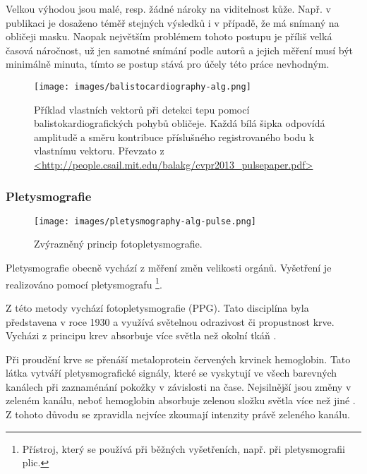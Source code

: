 \documentclass[
  digital, %
  table,   %
%
  lof,     %
  lot,     %
]{fithesis3}
\begin{document}
Velkou výhodou jsou malé, resp. žádné nároky na viditelnost kůže. Např. v publikaci je dosaženo téměř stejných výsledků i v případě, že má snímaný na obličeji masku. Naopak největším problémem tohoto postupu je příliš velká časová náročnost, už jen samotné snímání podle autorů a jejich měření musí být minimálně minuta, tímto se postup stává pro účely této práce nevhodným.

\begin{figure}
  \begin{center}
    \texttt{[image: images/balistocardiography-alg.png]}
  \end{center}
  \caption{Příklad vlastních vektorů při detekci tepu pomocí balistokardiografických pohybů obličeje. Každá bílá šipka odpovídá amplitudě a směru kontribuce příslušného registrovaného bodu k vlastnímu vektoru. Převzato z \url{<http://people.csail.mit.edu/balakg/cvpr2013_pulsepaper.pdf>}}
  \label{fig:balistografie-princip}
\end{figure}

\subsubsection{Pletysmografie}

\begin{figure}
  \begin{center}
    \texttt{[image: images/pletysmography-alg-pulse.png]}
  \end{center}
  \caption{Zvýrazněný princip fotopletysmografie.}
  \label{fig:pletysmography-princip}
\end{figure}

Pletysmografie obecně vychází z měření změn velikosti orgánů. Vyšetření je realizováno pomocí pletysmografu \footnote{Přístroj, který se používá při běžných vyšetřeních, např. při pletysmografii plic.}.

Z této metody vychází fotopletysmografie (PPG). Tato disciplína byla představena v roce 1930 a využívá světelnou odrazivost či propustnost krve. Vycházi z principu krev absorbuje více světla než okolní tkáň \cite{photo-plethysmographic}.

Při proudění krve se přenáší metaloprotein červených krvinek hemoglobin. Tato látka vytváří pletysmografické signály, které se vyskytují ve všech barevných kanálech při zaznaménání pokožky v závislosti na čase. Nejsilnější jsou změny v zeleném kanálu, neboť hemoglobin absorbuje zelenou složku světla více než jiné \cite{green-channel-strongest}. Z tohoto důvodu se zpravidla nejvíce zkoumají intenzity právě zeleného kanálu.
\end{document}
